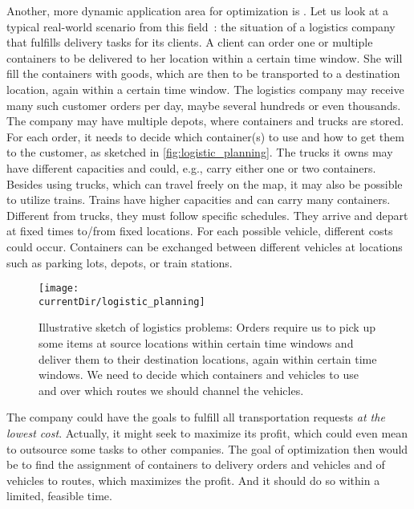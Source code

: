 %
%
\label{sec:intro:logistics}%
%
Another, more dynamic application area for optimization is .
Let us look at a typical real-world scenario from this field~\cite{WPG2009SRWVRPWEA,WPRGG2009EFTP}: the situation of a logistics company that fulfills delivery tasks for its clients.
A client can order one or multiple containers to be delivered to her location within a certain time window.
She will fill the containers with goods, which are then to be transported to a destination location, again within a certain time window.
The logistics company may receive many such customer orders per day, maybe several hundreds or even thousands.
The company may have multiple depots, where containers and trucks are stored.
For each order, it needs to decide which container(s) to use and how to get them to the customer, as sketched in \autoref{fig:logistic_planning}.
The trucks it owns may have different capacities and could, e.g., carry either one or two containers.
Besides using trucks, which can travel freely on the map, it may also be possible to utilize trains.
Trains have higher capacities and can carry many containers.
Different from trucks, they must follow specific schedules.
They arrive and depart at fixed times to/from fixed locations.
For each possible vehicle, different costs could occur.
Containers can be exchanged between different vehicles at locations such as parking lots, depots, or train stations.%
%
\begin{figure}%
\centering%
\texttt{[image: \\currentDir/logistic\_planning]}%
\caption{Illustrative sketch of logistics problems: Orders require us to pick up some items at source locations within certain time windows and deliver them to their destination locations, again within certain time windows. We need to decide which containers and vehicles to use and over which routes we should channel the vehicles.}
\label{fig:logistic_planning}
\end{figure}

The company could have the goals to fulfill all transportation requests \emph{at the lowest cost}.
Actually, it might seek to maximize its profit, which could even mean to outsource some tasks to other companies.
The goal of optimization then would be to find the assignment of containers to delivery orders and vehicles and of vehicles to routes, which maximizes the profit.
And it should do so within a limited, feasible time.

